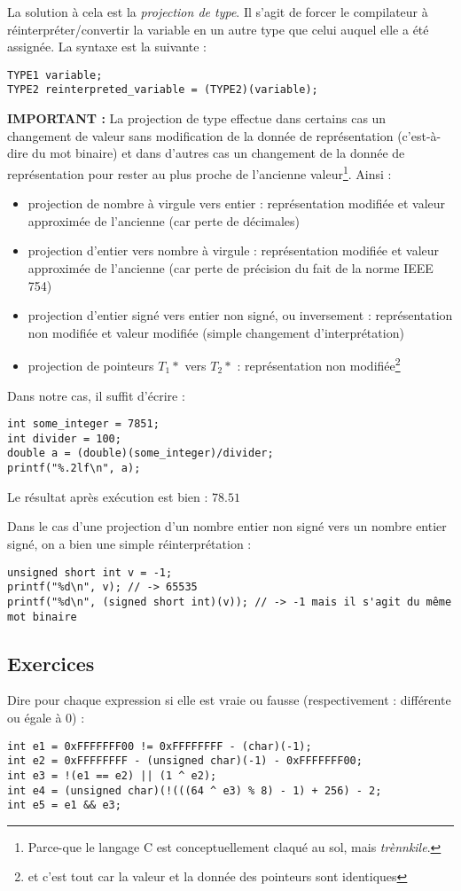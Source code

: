 \documentclass[../../../main.tex]{subfiles}
\begin{document}
La solution à cela est la \textit{projection de type}. Il s'agit de forcer le compilateur à réinterpréter/convertir la variable en un autre type que celui auquel elle a été assignée. La syntaxe est la suivante :
\begin{verbatim}
TYPE1 variable;
TYPE2 reinterpreted_variable = (TYPE2)(variable);
\end{verbatim}
\textbf{IMPORTANT :} La projection de type effectue dans certains cas un changement de valeur sans modification de la donnée de représentation (c'est-à-dire du mot binaire) et dans d'autres cas un changement de la donnée de représentation pour rester au plus proche de l'ancienne valeur\footnote{Parce-que le langage C est conceptuellement claqué au sol, mais \textit{trènnkile}.}. Ainsi :
\begin{itemize}
	\item projection de nombre à virgule vers entier : représentation modifiée et valeur approximée de l'ancienne (car perte de décimales)
	\item projection d'entier vers nombre à virgule : représentation modifiée et valeur approximée de l'ancienne (car perte de précision du fait de la norme IEEE 754)
	\item projection d'entier signé vers entier non signé, ou inversement : représentation non modifiée et valeur modifiée (simple changement d'interprétation)
	\item projection de pointeurs $T_1*$ vers $T_2*$ : représentation non modifiée\footnote{et c'est tout car la valeur et la donnée des pointeurs sont identiques}
\end{itemize}
Dans notre cas, il suffit d'écrire :
\begin{verbatim}
int some_integer = 7851;
int divider = 100;
double a = (double)(some_integer)/divider;
printf("%.2lf\n", a);
\end{verbatim}
Le résultat après exécution est bien : $78.51$

Dans le cas d'une projection d'un nombre entier non signé vers un nombre entier signé, on  a bien une simple réinterprétation : 
\begin{verbatim}
unsigned short int v = -1;
printf("%d\n", v); // -> 65535
printf("%d\n", (signed short int)(v)); // -> -1 mais il s'agit du même mot binaire
\end{verbatim}
\subsection{Exercices}
\newline
Dire pour chaque expression si elle est vraie ou fausse (respectivement : différente ou égale à 0) :
\begin{verbatim}
int e1 = 0xFFFFFFF00 != 0xFFFFFFFF - (char)(-1);
int e2 = 0xFFFFFFFF - (unsigned char)(-1) - 0xFFFFFFF00;
int e3 = !(e1 == e2) || (1 ^ e2);
int e4 = (unsigned char)(!(((64 ^ e3) % 8) - 1) + 256) - 2;
int e5 = e1 && e3;
\end{verbatim}
\end{document}
